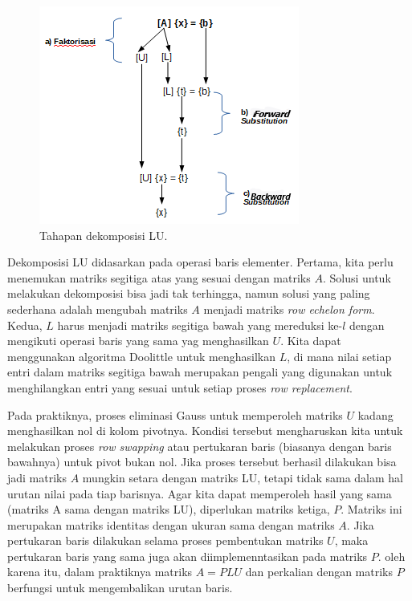 \documentclass[]{book}
\theoremstyle{definition}
\theoremstyle{definition}
\theoremstyle{definition}
\theoremstyle{remark}
\begin{document}
\begin{figure}

{\centering \includegraphics[width=0.9\linewidth]{./images/LU} 

}

\caption{Tahapan dekomposisi LU.}\label{fig:LUfig}
\end{figure}

Dekomposisi LU didasarkan pada operasi baris elementer. Pertama, kita perlu menemukan matriks segitiga atas yang sesuai dengan matriks \(A\). Solusi untuk melakukan dekomposisi bisa jadi tak terhingga, namun solusi yang paling sederhana adalah mengubah matriks \(A\) menjadi matriks \emph{row echelon form}. Kedua, \(L\) harus menjadi matriks segitiga bawah yang mereduksi ke-\(l\) dengan mengikuti operasi baris yang sama yag menghasilkan \(U\). Kita dapat menggunakan algoritma Doolittle untuk menghasilkan \(L\), di mana nilai setiap entri dalam matriks segitiga bawah merupakan pengali yang digunakan untuk menghilangkan entri yang sesuai untuk setiap proses \emph{row replacement}.

Pada praktiknya, proses eliminasi Gauss untuk memperoleh matriks \(U\) kadang menghasilkan nol di kolom pivotnya. Kondisi tersebut mengharuskan kita untuk melakukan proses \emph{row swapping} atau pertukaran baris (biasanya dengan baris bawahnya) untuk pivot bukan nol. Jika proses tersebut berhasil dilakukan bisa jadi matriks \(A\) mungkin setara dengan matriks LU, tetapi tidak sama dalam hal urutan nilai pada tiap barisnya. Agar kita dapat memperoleh hasil yang sama (matriks A sama dengan matriks LU), diperlukan matriks ketiga, \(P\). Matriks ini merupakan matriks identitas dengan ukuran sama dengan matriks \(A\). Jika pertukaran baris dilakukan selama proses pembentukan matriks \(U\), maka pertukaran baris yang sama juga akan diimplemenntasikan pada matriks \(P\). oleh karena itu, dalam praktiknya matriks \(A=PLU\) dan perkalian dengan matriks \(P\) berfungsi untuk mengembalikan urutan baris.
\end{document}
